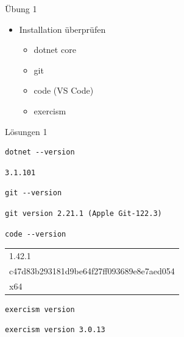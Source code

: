 \documentclass[t]{beamer}
\begin{document}
\begin{frame}[label={sec:orgd6fd0c7}]{Übung 1}
\begin{itemize}
\item Installation überprüfen
\begin{itemize}
\item dotnet core
\item git
\item code (VS Code)
\item exercism
\end{itemize}
\end{itemize}
\end{frame}

\begin{frame}[label={sec:org338e91e},fragile]{Lösungen 1}
 \scriptsize
\begin{verbatim}
dotnet --version
\end{verbatim}

\begin{verbatim}
3.1.101
\end{verbatim}


\begin{verbatim}
git --version
\end{verbatim}

\begin{verbatim}
git version 2.21.1 (Apple Git-122.3)
\end{verbatim}



\begin{verbatim}
code --version
\end{verbatim}

\begin{tabular}{l}
1.42.1\\
c47d83b293181d9be64f27ff093689e8e7aed054\\
x64\\
\end{tabular}

\begin{verbatim}
exercism version
\end{verbatim}

\begin{verbatim}
exercism version 3.0.13
\end{verbatim}
\end{frame}
\end{document}
